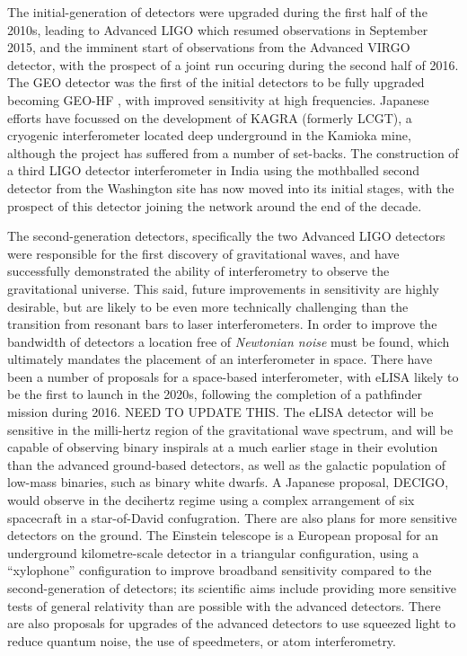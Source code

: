 The initial-generation of detectors were upgraded during the first
half of the 2010s, leading to Advanced LIGO\cite{2015CQGra..32g4001L}
which resumed observations in September 2015, and the imminent start
of observations from the Advanced VIRGO
detector\cite{2015CQGra..32b4001A}, with the prospect of a joint run
occuring during the second half of 2016. The GEO detector was the
first of the initial detectors to be fully upgraded becoming GEO-HF
\cite{2006CQGra..23S.207W}, with improved sensitivity at high
frequencies. Japanese efforts have focussed on the development of
KAGRA (formerly LCGT), a cryogenic interferometer located deep
underground in the Kamioka mine\cite{1999IJMPD...8..557K}, although
the project has suffered from a number of set-backs. The construction
of a third LIGO detector interferometer in India using the mothballed
second detector from the Washington site has now moved into its
initial stages, with the prospect of this detector joining the network
around the end of the decade.

The second-generation detectors, specifically the two Advanced LIGO
detectors were responsible for the first discovery of gravitational
waves\cite{2016PhRvL.116m1103A}, and have successfully demonstrated
the ability of interferometry to observe the gravitational
universe. This said, future improvements in sensitivity are highly
desirable, but are likely to be even more technically challenging than
the transition from resonant bars to laser interferometers. In order
to improve the bandwidth of detectors a location free of
\emph{Newtonian noise} must be found, which ultimately mandates the
placement of an interferometer in space. There have been a number of
proposals for a space-based interferometer, with
eLISA\cite{2013GWN.....6....4A} likely to be the first to launch in
the 2020s, following the completion of a pathfinder mission during
2016\cite{2015JPhCS.610a2005A}. NEED TO UPDATE THIS. The eLISA detector will be sensitive
in the milli-hertz region of the gravitational wave spectrum, and will
be capable of observing binary inspirals at a much earlier stage in
their evolution than the advanced ground-based detectors, as well as
the galactic population of low-mass binaries, such as binary white
dwarfs. A Japanese proposal, DECIGO\cite{2011CQGra..28i4011K}, would
observe in the decihertz regime using a complex arrangement of six
spacecraft in a star-of-David confugration. There are also plans for
more sensitive detectors on the ground. The Einstein telescope is a
European proposal for an underground kilometre-scale detector in a
triangular configuration, using a ``xylophone'' configuration to
improve broadband sensitivity compared to the second-generation of
detectors; its scientific aims include providing more sensitive tests
of general relativity than are possible with the advanced
detectors\cite{2012CQGra..29l4013S}. There are also proposals for
upgrades of the advanced detectors to use squeezed light to reduce
quantum noise\cite{2015PhRvD..91f2005M}, the use of
speedmeters\cite{2014MUPB...69..519V,2002gr.qc....11088K}, or atom
interferometry\cite{2013PhRvL.110q1102G,2016PhRvD..93b1101C,2008PhRvD..78l2002D}.

